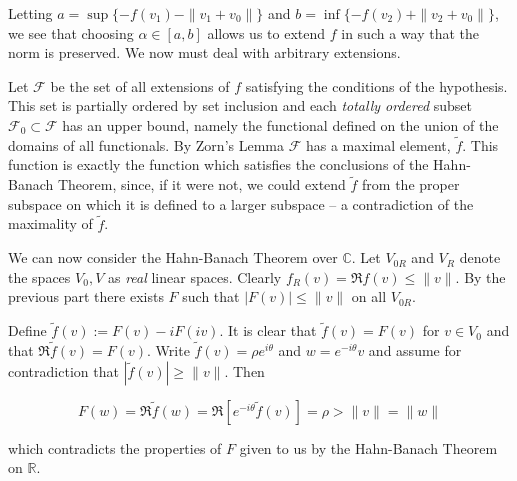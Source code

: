 \documentclass[11pt]{article}
\begin{document}
\begin{enumerate}
Letting $a = \sup\{-f(v_1) - \|v_1 + v_0\|\}$ and $b = \inf\{-f(v_2) +\|v_2 + v_0\|\}$, we see that choosing $\alpha \in [a,b]$ allows us to extend $f$ in such a way that the norm is preserved.  We now must deal with arbitrary extensions.

Let $\mathcal{F}$ be the set of all extensions of $f$ satisfying the conditions of the hypothesis.  This set is partially ordered by set inclusion and each \emph{totally ordered} subset $\mathcal{F}_0 \subset \mathcal{F}$ has an upper bound, namely the functional defined on the union of the domains of all functionals.  By Zorn's Lemma $\mathcal{F}$ has a maximal element, $\tilde{f}$.  This function is exactly the function which satisfies the conclusions of the Hahn-Banach Theorem, since, if it were not, we could extend $\tilde{f}$ from the proper subspace on which it is defined to a larger subspace -- a contradiction of the maximality of $\tilde{f}$.

We can now consider the Hahn-Banach Theorem over $\mathbb{C}$.  Let $V_{0R}$ and $V_R$ denote the spaces $V_0,V$ as \emph{real} linear spaces.  Clearly $f_R(v) = \Re f(v) \leq \|v\|$.  By the previous part there exists $F$ such that $|F(v)| \leq \|v\|$ on all $V_{0R}$.

Define $\tilde{f}(v) := F(v) - iF(iv)$.  It is clear that $\tilde{f}(v) = F(v)$ for $v \in V_0$ and that $\Re \tilde{f}(v) = F(v)$.  Write $\tilde{f}(v) = \rho e^{i \theta}$ and $w = e^{-i \theta}v$ and assume for contradiction that $|\tilde{f}(v)| \geq \|v\|$.  Then

\[
F(w) = \Re \tilde{f}(w) = \Re[e^{-i \theta} \tilde{f}(v)] = \rho > \|v\| = \|w\|
\]

which contradicts the properties of $F$ given to us by the Hahn-Banach Theorem on $\mathbb{R}$.
\end{enumerate}
\end{document}
